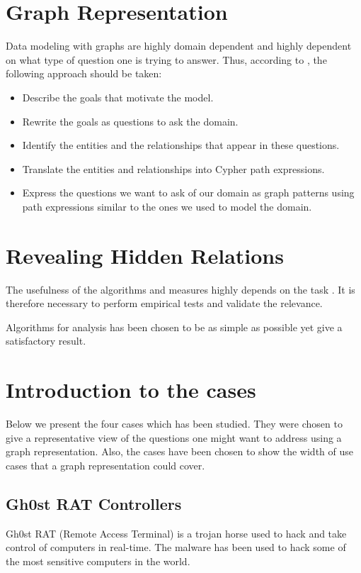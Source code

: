 \section{Graph Representation}
Data modeling with graphs are highly domain dependent and highly dependent on what type of question one is trying to answer. Thus, according to \citet{robinson2013}, the following approach should be taken:
\begin{itemize}
    \item Describe the goals that motivate the model.
    \item Rewrite the goals as questions to ask the domain.
    \item Identify the entities and the relationships that appear in these questions. 
    \item Translate the entities and relationships into Cypher path expressions.
    \item Express the questions we want to ask of our domain as graph patterns using path expressions similar to the ones we used to model the domain. 
\end{itemize}

\section{Revealing Hidden Relations}

The usefulness of the algorithms and measures highly depends on the task \cite{fouss2016algorithms}. It is therefore necessary to perform empirical tests and validate the relevance. 

Algorithms for analysis has been chosen to be as simple as possible yet give a satisfactory result. 


\section{Introduction to the cases}
Below we present the four cases which has been studied. They were chosen to give a representative view of the questions one might want to address using a graph representation. Also, the cases have been chosen to show the width of use cases that a graph representation could cover.

\subsection{Gh0st RAT Controllers}
Gh0st RAT (Remote Access Terminal) is a trojan horse used to hack and take control of computers in real-time. The malware has been used to hack some of the most sensitive computers in the world.


